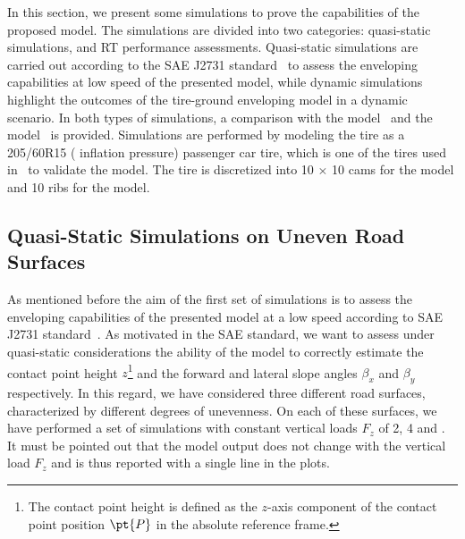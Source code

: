 In this section, we present some simulations to prove the capabilities of the proposed model. The simulations are divided into two categories: quasi-static simulations, and \ac{RT} performance assessments. Quasi-static simulations are carried out according to the SAE J2731 standard~\cite{saej2731} to assess the enveloping capabilities at low speed of the presented model, while dynamic simulations highlight the outcomes of the tire-ground enveloping model in a dynamic scenario. In both types of simulations, a comparison with the \Swift{} model~\cite{schmeitz2004semiempirical} and the \TMEasy{} model~\cite{rill2018sophisticated} is provided. Simulations are performed by modeling the tire as a 205/60R15 ( inflation pressure) passenger car tire, which is one of the tires used in~\cite{schmeitz2004semiempirical} to validate the \Swift{} model. The tire is discretized into 10 $\times$ 10 cams for the \Swift{} model and 10 ribs for the \Enve{} model.

\subsection{Quasi-Static Simulations on Uneven Road Surfaces}
\label{app2:sec:enveloping}

As mentioned before the aim of the first set of simulations is to assess the enveloping capabilities of the presented model at a low speed according to SAE J2731 standard~\cite{saej2731}. As motivated in the SAE standard, we want to assess under quasi-static considerations the ability of the model to correctly estimate the contact point height $z$\footnote{The contact point height is defined as the $z$-axis component of the contact point position $\pt{P}$ in the absolute reference frame.} and the forward and lateral slope angles $\beta_x$ and $\beta_y$ respectively. In this regard, we have considered three different road surfaces, characterized by different degrees of unevenness. On each of these surfaces, we have performed a set of simulations with constant vertical loads $F_z$ of 2, 4 and . It must be pointed out that the \TMEasy{} model output does not change with the vertical load $F_z$ and is thus reported with a single line in the plots.

